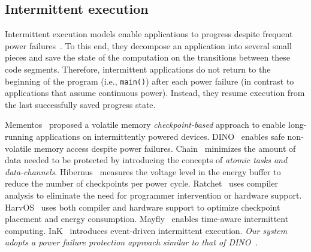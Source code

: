 \subsection{Intermittent execution}
Intermittent execution models enable applications to progress despite frequent power failures~\cite{van2016intermittent,colin2016chain,lucia2015simpler,bhatti2017harvos,gobieski2019intelligence}. To this end, they decompose an application into several small pieces and save the state of the computation on the transitions between these code segments. Therefore, intermittent applications do not return to the beginning of the program (i.e., \texttt{main()}) after each power failure (in contrast to  applications that assume continuous power). Instead, they resume execution from the last successfully saved progress state.   


Mementos~\cite{ransford2011mementos} proposed a volatile memory \emph{checkpoint-based} approach to enable long-running applications on intermittently powered devices. DINO~\cite{dino} enables safe non-volatile memory access despite power failures. Chain~\cite{colin2016chain} minimizes the amount of data needed to be protected by introducing the concepts of \emph{atomic tasks and data-channels}. Hibernus~\cite{balsamo2014hibernus,balsamo2016hibernus++} measures the voltage level in the energy buffer to reduce the number of checkpoints per power cycle. Ratchet~\cite{van2016intermittent} uses compiler analysis to eliminate the need for programmer intervention or hardware support. HarvOS~\cite{bhatti2017harvos} uses both compiler and hardware support to optimize checkpoint placement and energy consumption. Mayfly~\cite{hester2017timely} enables time-aware intermittent computing. InK~\cite{yildirim2018ink} introduces event-driven intermittent execution.  
\emph{Our system adopts a power failure protection approach similar to that of DINO~\cite{dino}.}


